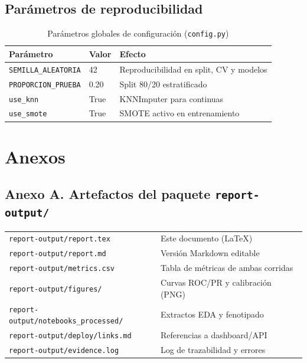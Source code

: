 \documentclass[12pt,a4paper]{article}
\begin{document}
\subsection{Parámetros de reproducibilidad}

\begin{table}[H]
  \centering
  \caption{Parámetros globales de configuración (\texttt{config.py})}
  \begin{tabular}{lll}
    \toprule
    \textbf{Parámetro} & \textbf{Valor} & \textbf{Efecto}\\
    \midrule
    \texttt{SEMILLA\_ALEATORIA} & 42 & Reproducibilidad en split, CV y modelos\\
    \texttt{PROPORCION\_PRUEBA} & 0.20 & Split 80/20 estratificado\\
    \texttt{use\_knn} & True & KNNImputer para continuas\\
    \texttt{use\_smote} & True & SMOTE activo en entrenamiento\\
    \bottomrule
  \end{tabular}
\end{table}

\section*{Anexos}

\subsection*{Anexo A. Artefactos del paquete \texttt{report-output/}}

\begin{tabular}{ll}
  \texttt{report-output/report.tex} & Este documento (LaTeX)\\
  \texttt{report-output/report.md} & Versión Markdown editable\\
  \texttt{report-output/metrics.csv} & Tabla de métricas de ambas corridas\\
  \texttt{report-output/figures/} & Curvas ROC/PR y calibración (PNG)\\
  \texttt{report-output/notebooks\_processed/} & Extractos EDA y fenotipado\\
  \texttt{report-output/deploy/links.md} & Referencias a dashboard/API\\
  \texttt{report-output/evidence.log} & Log de trazabilidad y errores\\
\end{tabular}
\end{document}

